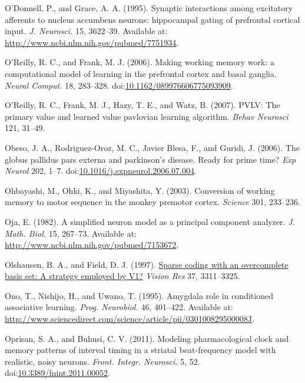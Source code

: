 \documentclass[
  11pt,
  a4paper,
]{scrbook}
\newlength{\cslhangindent}
\newenvironment{CSLReferences}[2] %
 {\begin{list}{}{%
  \setlength{\itemindent}{0pt}
  \setlength{\leftmargin}{0pt}
  \setlength{\parsep}{0pt}
  \ifodd #1
   \setlength{\leftmargin}{\cslhangindent}
   \setlength{\itemindent}{-1\cslhangindent}
  \fi
  \setlength{\itemsep}{#2\baselineskip}}}
 {\end{list}}
\begin{document}
\begin{CSLReferences}{1}{1}
O'Donnell, P., and Grace, A. A. (1995). {Synaptic interactions among
excitatory afferents to nucleus accumbens neurons: hippocampal gating of
prefrontal cortical input.} \emph{J. Neurosci.} 15, 3622--39. Available
at: \url{http://www.ncbi.nlm.nih.gov/pubmed/7751934}.

O'Reilly, R. C., and Frank, M. J. (2006). {Making working memory work: a
computational model of learning in the prefrontal cortex and basal
ganglia.} \emph{Neural Comput.} 18, 283--328.
doi:\href{https://doi.org/10.1162/089976606775093909}{10.1162/089976606775093909}.

O'Reilly, R. C., Frank, M. J., Hazy, T. E., and Watz, B. (2007). {PVLV:}
The primary value and learned value pavlovian learning algorithm.
\emph{Behav Neurosci} 121, 31--49.

Obeso, J. A., Rodriguez-Oroz, M. C., Javier Blesa, F., and Guridi, J.
(2006). The globus pallidus pars externa and parkinson's disease. Ready
for prime time? \emph{Exp Neurol} 202, 1--7.
doi:\href{https://doi.org/10.1016/j.expneurol.2006.07.004}{10.1016/j.expneurol.2006.07.004}.

Ohbayashi, M., Ohki, K., and Miyashita, Y. (2003). Conversion of working
memory to motor sequence in the monkey premotor cortex. \emph{Science}
301, 233--236.

Oja, E. (1982). {A simplified neuron model as a principal component
analyzer.} \emph{J. Math. Biol.} 15, 267--73. Available at:
\url{http://www.ncbi.nlm.nih.gov/pubmed/7153672}.

Olshausen, B. A., and Field, D. J. (1997).
\href{https://www.ncbi.nlm.nih.gov/pubmed/9425546}{Sparse coding with an
overcomplete basis set: A strategy employed by V1?} \emph{Vision Res}
37, 3311--3325.

Ono, T., Nishijo, H., and Uwano, T. (1995). {Amygdala role in
conditioned associative learning}. \emph{Prog. Neurobiol.} 46, 401--422.
Available at:
\url{http://www.sciencedirect.com/science/article/pii/030100829500008J}.

Oprisan, S. A., and Buhusi, C. V. (2011). {Modeling pharmacological
clock and memory patterns of interval timing in a striatal
beat-frequency model with realistic, noisy neurons.} \emph{Front.
Integr. Neurosci.} 5, 52.
doi:\href{https://doi.org/10.3389/fnint.2011.00052}{10.3389/fnint.2011.00052}.


\end{CSLReferences}
\end{document}

